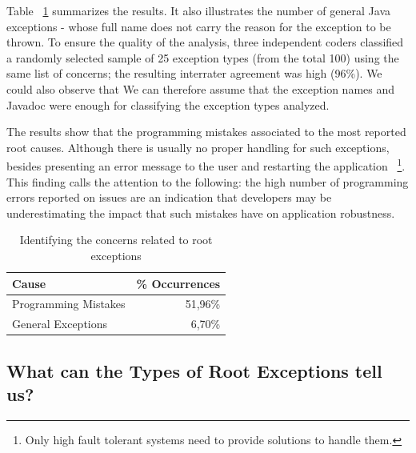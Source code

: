 \documentclass[conference]{IEEEtran}
\begin{document}
Table ~\ref{tab:causes} summarizes the results. It also illustrates the number of general Java exceptions - 
whose full name does not carry the reason for the exception to be thrown.
To ensure the quality of the analysis, three independent coders classified a randomly selected
sample of 25 exception types (from the total 100) using the same list of concerns;
the resulting interrater agreement was high (96\%). We could also observe that
We can therefore assume that the exception names and Javadoc 
were enough for classifying the exception types analyzed. 

The results show that the programming mistakes associated to the most reported root causes. 
Although there is usually no proper handling for such exceptions, 
besides presenting an error message to the user and restarting the application ~\footnote{Only 
high fault tolerant systems need to provide solutions to handle them.}.  
This finding calls the attention to the following: the high number of programming errors reported 
on issues are an indication that developers may be underestimating the impact that such 
mistakes have on application robustness.

\begin{table}
  \centering
  \begin{tabular}{lr}
    \hline
    \bfseries{Cause} &  \bfseries{\% Occurrences} \\
    \hline
      Programming Mistakes &  51,96\%\\ 
      General Exceptions   &  6,70\%\\
    \hline
 \end{tabular}
  \caption{Identifying the concerns related to root exceptions}
  \label{tab:causes}
\end{table}



\noindent {}

\subsection{What can the Types of Root Exceptions tell us?}
\end{document}
